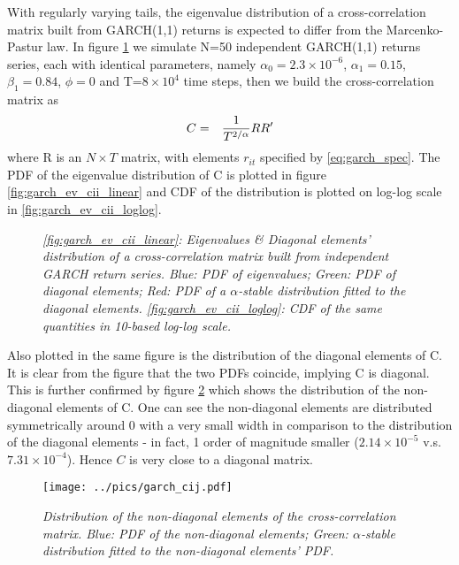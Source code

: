 \documentclass{report}
\begin{document}
With regularly varying tails, the eigenvalue distribution of a
cross-correlation matrix built from GARCH(1,1) returns is expected to
differ from the Marcenko-Pastur law. In figure
\ref{fig:garch_ev_cii} we simulate N=50 independent GARCH(1,1)
returns series, each with identical parameters, namely $\alpha_0 =
2.3\times 10^{-6}$, $\alpha_1 = 0.15$, $\beta_1 = 0.84$, $\phi = 0$
and T=$8\times10^4$ time steps, then we build the cross-correlation
matrix as
\begin{eqnarray*}
  C &=& {1 \over T^{2/\alpha}} RR'
\end{eqnarray*}
where R is an $N\times T$ matrix, with elements $r_{it}$ specified by
\ref{eq:garch_spec}. The PDF of the eigenvalue distribution of C is
plotted in figure \ref{fig:garch_ev_cii_linear} and CDF of the
distribution is plotted on log-log scale in
\ref{fig:garch_ev_cii_loglog}.
\begin{figure}[htb!]
  \centering
  \caption{\small \it \ref{fig:garch_ev_cii_linear}: Eigenvalues \&
    Diagonal elements' distribution of a cross-correlation matrix
    built from independent GARCH return series. Blue: PDF of
    eigenvalues; Green: PDF of diagonal elements; Red: PDF of a
    $\alpha$-stable distribution fitted to the diagonal
    elements. \ref{fig:garch_ev_cii_loglog}: CDF of the same
    quantities in 10-based log-log scale.}
  \label{fig:garch_ev_cii}
\end{figure}
Also plotted in the same figure is the distribution of the diagonal
elements of C. It is clear from the figure that the two PDFs coincide,
implying C is diagonal. This is further confirmed by figure
\ref{fig:garch_cij} which shows the distribution of the non-diagonal
elements of C. One can see the non-diagonal elements are distributed
symmetrically around 0 with a very small width in comparison to the
distribution of the diagonal elements - in fact, 1 order of magnitude
smaller ($2.14\times10^{-5}$ v.s. $7.31\times 10^{-4}$). Hence $C$ is
very close to a diagonal matrix.
\begin{figure}[htb!]
  \centering
    \texttt{[image: ../pics/garch\_cij.pdf]}
  \caption{\small \it Distribution of the non-diagonal elements of
    the cross-correlation matrix. Blue: PDF of the non-diagonal
    elements; Green: $\alpha$-stable distribution fitted to the
    non-diagonal elements' PDF.}
  \label{fig:garch_cij}
\end{figure}
\end{document}
